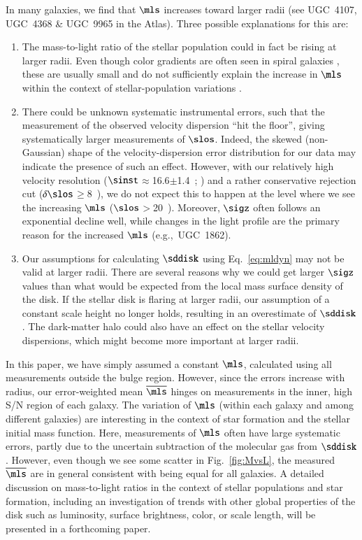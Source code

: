 \documentclass[traditabstract]{aa} %
\begin{document}
In many galaxies, we find that $\mls$ increases toward larger radii (see UGC~4107,
UGC~4368 \& UGC~9965 in the Atlas). Three possible explanations for this are:
%
\begin{enumerate}
\item The mass-to-light ratio of the stellar population could in fact be rising at larger 
radii. Even though color gradients are often seen in spiral galaxies 
\citep[e.g.,][]{deJong1996}, these are usually small and do not sufficiently explain the 
increase in $\mls$ within the context of stellar-population variations .
%
\item There could be unknown systematic instrumental errors, such that the measurement of 
the observed velocity dispersion ``hit the floor'', giving systematically larger 
measurements of $\slos$. Indeed, the skewed (non-Gaussian) shape of the velocity-dispersion
error distribution for our data may indicate the presence of such an effect. However, with 
our relatively high velocity resolution ($\sinst$$\approx$16.6$\pm$1.4~\kms; 
) and a rather conservative rejection cut 
($\delta \slos$$\geq$8~\kms), we do not expect this to happen at the level where we see 
the increasing $\mls$ ($\slos$$>$20~\kms). Moreover, $\sigz$ often follows an exponential 
decline well, while changes in the light profile are the primary reason for the 
increased $\mls$ (e.g.,\ UGC~1862).
%
\item Our assumptions for calculating $\sddisk$ using Eq.~\ref{eq:mldyn} may not be 
valid at larger radii. There are several reasons why we could get larger $\sigz$ values 
than what would be expected from the local mass surface density of the disk. If the 
stellar disk is flaring at larger radii, our assumption of a constant scale height no 
longer holds, resulting in an overestimate of $\sddisk$. The dark-matter halo could also
have an effect on the stellar velocity dispersions, which might become more important at
larger radii.
\end{enumerate}

\noindent In this paper, we have simply assumed a constant $\mls$, calculated using all
measurements outside the bulge region. However, since the errors increase with radius, our
error-weighted mean $\overline{\mls}$ hinges on measurements in the inner, high S/N region
of each galaxy.
%
The variation of $\mls$ (within each galaxy and among different galaxies) are interesting 
in the context of star formation and the stellar initial mass function. Here, measurements
of $\mls$ often have large systematic errors, partly due to the uncertain subtraction of 
the molecular gas from $\sddisk$. However, even though we see some scatter in 
Fig.~\ref{fig:MvsL}, the measured $\overline{\mls}$ are in general consistent with being
equal for all galaxies.
A detailed discussion on mass-to-light ratios in the context of stellar populations and
star formation, including an investigation of trends with other global properties of the
disk such as luminosity, surface brightness, color, or scale length, will be presented in 
a forthcoming paper.
\end{document}
